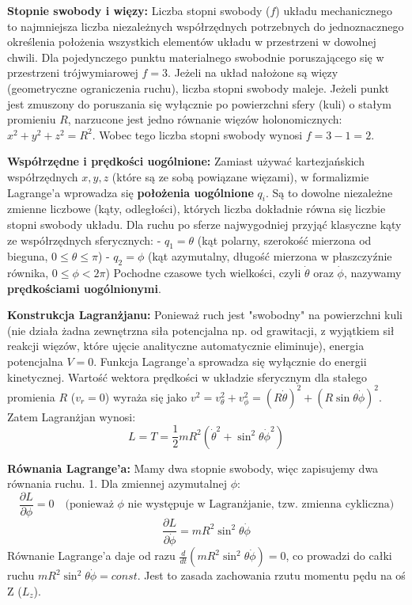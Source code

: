 \documentclass[11pt, a4paper]{article}
\begin{document}
\textbf{Stopnie swobody i więzy:}
Liczba stopni swobody ($f$) układu mechanicznego to najmniejsza liczba niezależnych współrzędnych potrzebnych do jednoznacznego określenia położenia wszystkich elementów układu w przestrzeni w dowolnej chwili. Dla pojedynczego punktu materialnego swobodnie poruszającego się w przestrzeni trójwymiarowej $f = 3$. 
Jeżeli na układ nałożone są więzy (geometryczne ograniczenia ruchu), liczba stopni swobody maleje. Jeżeli punkt jest zmuszony do poruszania się wyłącznie po powierzchni sfery (kuli) o stałym promieniu $R$, narzucone jest jedno równanie więzów holonomicznych: $x^2 + y^2 + z^2 = R^2$. Wobec tego liczba stopni swobody wynosi $f = 3 - 1 = 2$.

\textbf{Współrzędne i prędkości uogólnione:}
Zamiast używać kartezjańskich współrzędnych $x, y, z$ (które są ze sobą powiązane więzami), w formalizmie Lagrange'a wprowadza się \textbf{położenia uogólnione} $q_i$. Są to dowolne niezależne zmienne liczbowe (kąty, odległości), których liczba dokładnie równa się liczbie stopni swobody układu. 
Dla ruchu po sferze najwygodniej przyjąć klasyczne kąty ze współrzędnych sferycznych:
- $q_1 = \theta$ (kąt polarny, szerokość mierzona od bieguna, $0 \le \theta \le \pi$)
- $q_2 = \phi$ (kąt azymutalny, długość mierzona w płaszczyźnie równika, $0 \le \phi < 2\pi$)
Pochodne czasowe tych wielkości, czyli $\dot{\theta}$ oraz $\dot{\phi}$, nazywamy \textbf{prędkościami uogólnionymi}.

\textbf{Konstrukcja Lagranżjanu:}
Ponieważ ruch jest "swobodny" na powierzchni kuli (nie działa żadna zewnętrzna siła potencjalna np. od grawitacji, z wyjątkiem sił reakcji więzów, które ujęcie analityczne automatycznie eliminuje), energia potencjalna $V = 0$.
Funkcja Lagrange'a sprowadza się wyłącznie do energii kinetycznej. Wartość wektora prędkości w układzie sferycznym dla stałego promienia $R$ ($v_r = 0$) wyraża się jako $v^2 = v_\theta^2 + v_\phi^2 = (R\dot{\theta})^2 + (R\sin\theta\dot{\phi})^2$. Zatem Lagranżjan wynosi:
\[
L = T = \frac{1}{2}m R^2 \left(\dot{\theta}^2 + \sin^2\theta \dot{\phi}^2\right)
\]

\textbf{Równania Lagrange'a:}
Mamy dwa stopnie swobody, więc zapisujemy dwa równania ruchu.
1. Dla zmiennej azymutalnej $\phi$:
\[
\frac{\partial L}{\partial \phi} = 0 \quad \text{(ponieważ $\phi$ nie występuje w Lagranżjanie, tzw. zmienna cykliczna)}
\]
\[
\frac{\partial L}{\partial \dot{\phi}} = m R^2 \sin^2\theta \dot{\phi}
\]
Równanie Lagrange'a daje od razu $\frac{d}{dt}(m R^2 \sin^2\theta \dot{\phi}) = 0$, co prowadzi do całki ruchu $m R^2 \sin^2\theta \dot{\phi} = const$. Jest to zasada zachowania rzutu momentu pędu na oś Z ($L_z$).
\end{document}
